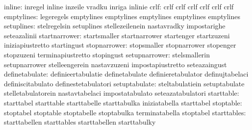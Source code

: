                           inline: inregel                          inline
                                  inzeile                          vradku
                                  inriga                           inlinie
                            crlf: crlf                             crlf
                                  crlf                             crlf
                                  crlf                             crlf
emptylines: legeregels emptylines
            emptylines emptylines
            emptylines emptylines
                      setuplines: stelregelsin                     setuplines
                                  stellezeilenein                  nastavradky
                                  impostarighe                     seteazalinii
                   startnarrower: startsmaller                     startnarrower
                                  startenger                       startzuzeni
                                  iniziapiustretto                 startingust
                    stopnarrower: stopsmaller                      stopnarrower
                                  stopenger                        stopzuzeni
                                  terminapiustretto                stopingust
                   setupnarrower: stelsmallerin                    setupnarrower
                                  stelleengerein                   nastavzuzeni
                                  impostapiustretto                seteazaingust
                  definetabulate: definieertabulatie               definetabulate
                                  definieretabulator               definujtabelaci
                                  definiscitabulato                definestetabulatori
                   setuptabulate: steltabulatiein                  setuptabulate
                                  stelletabulatorein               nastavtabelaci
                                  impostatabulato                  seteazatabulatori
                      starttable: starttabel                       starttable
                                  starttabelle                     starttabulka
                                  iniziatabella                    starttabel
                       stoptable: stoptabel                        stoptable
                                  stoptabelle                      stoptabulka
                                  terminatabella                   stoptabel
                     starttables: starttabellen                    starttables
                                  starttabellen                    starttabulky
